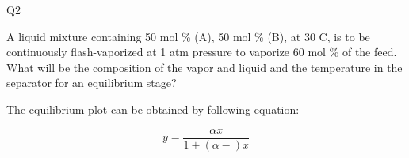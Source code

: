 


Q2


A liquid mixture containing 50 mol \%  (A), 50 mol \% (B), at 30 C, is to be continuously flash-vaporized at 1 atm pressure to vaporize 60 mol \% of the feed. What will be the composition of the vapor and liquid and the temperature in the separator for an equilibrium stage?

The equilibrium plot can be obtained by following equation: 

$$y=\frac{\alpha x}{1+(\alpha-)x }$$

